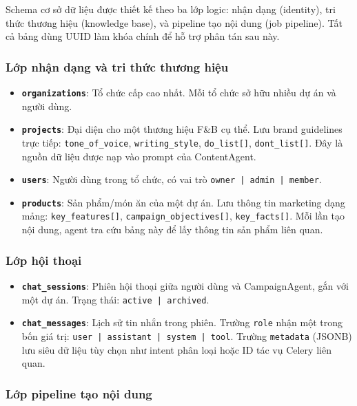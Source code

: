 Schema cơ sở dữ liệu được thiết kế theo ba lớp logic: nhận dạng
(identity), tri thức thương hiệu (knowledge base), và pipeline tạo nội
dung (job pipeline). Tất cả bảng dùng UUID làm khóa chính để hỗ trợ
phân tán sau này.

\subsubsection{Lớp nhận dạng và tri thức thương hiệu}

\begin{itemize}
  \item \textbf{\texttt{organizations}}: Tổ chức cấp cao nhất. Mỗi tổ
    chức sở hữu nhiều dự án và người dùng.
  \item \textbf{\texttt{projects}}: Đại diện cho một thương hiệu F\&B cụ
    thể. Lưu brand guidelines trực tiếp: \texttt{tone\_of\_voice},
    \texttt{writing\_style}, \texttt{do\_list[]},
    \texttt{dont\_list[]}. Đây là nguồn dữ liệu được nạp vào prompt của
    ContentAgent.
  \item \textbf{\texttt{users}}: Người dùng trong tổ chức, có vai trò
    \texttt{owner | admin | member}.
  \item \textbf{\texttt{products}}: Sản phẩm/món ăn của một dự án. Lưu
    thông tin marketing dạng mảng: \texttt{key\_features[]},
    \texttt{campaign\_objectives[]}, \texttt{key\_facts[]}. Mỗi lần tạo
    nội dung, agent tra cứu bảng này để lấy thông tin sản phẩm liên quan.
\end{itemize}

\subsubsection{Lớp hội thoại}

\begin{itemize}
  \item \textbf{\texttt{chat\_sessions}}: Phiên hội thoại giữa người dùng
    và CampaignAgent, gắn với một dự án. Trạng thái:
    \texttt{active | archived}.
  \item \textbf{\texttt{chat\_messages}}: Lịch sử tin nhắn trong phiên.
    Trường \texttt{role} nhận một trong bốn giá trị:
    \texttt{user | assistant | system | tool}. Trường \texttt{metadata}
    (JSONB) lưu siêu dữ liệu tùy chọn như intent phân loại hoặc ID tác
    vụ Celery liên quan.
\end{itemize}

\subsubsection{Lớp pipeline tạo nội dung}

